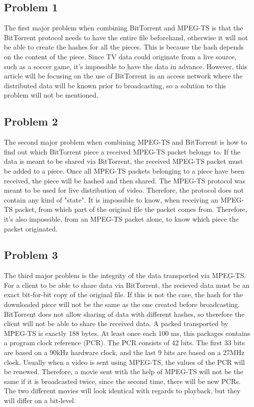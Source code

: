 \documentclass[11pt,oneside,a4paper,onecolumn]{article}
\begin{document}
\subsection{Problem 1}
\label{sec:p1}
The first major problem when combining BitTorrent and MPEG-TS is that
the 
BitTorrent protocol needs to have the entire file beforehand, otherwise
it will not be able to create the hashes for all the pieces. This is
because the hash depends on the content of the piece. Since TV data could originate from a live source, such as a soccer game,
it's impossible to have the data in advance. However, this
article will be focusing on the use of BitTorrent in an access
network where the distributed data will be known prior to broadcasting, so
 a solution to this problem will not be mentioned.

\subsection{Problem 2}
The second major problem when combining MPEG-TS and BitTorrent is how to
find out which BitTorrent piece a received MPEG-TS packet belongs
to. If the data is meant
to be shared via BitTorrent, the received MPEG-TS packet must be added
to a piece. Once all MPEG-TS packets belonging to a piece have been received,
the piece will be hashed and then shared.
The MPEG-TS protocol was meant to be used for live distribution
of video. Therefore, the protocol does not contain any kind of "state".
It is impossible to know, when receiving an MPEG-TS packet, from which
part of the original file the packet comes from. Therefore, it's also
impossible, from an MPEG-TS packet alone, to know which piece the packet
originated.

\subsection{Problem 3}
The third major problem is the integrity of the data transported via
MPEG-TS. For a client to be able to share data via BitTorrent, the
recieved data must be an exact bit-for-bit copy of the original file. If
this is not the case, the hash for the downloaded piece will not be the
same as the one created before broadcasting. BitTorrent does not allow
sharing of data with different hashes, so therefore the client will not be
able to share the received data. A packed transported by MPEG-TS is exactly 188 bytes. At least once
each 100 ms, this packages contains a program clock reference (PCR).
The PCR consists of 42 bits. The first 33 bits are based on a 90kHz
hardware clock, and the last 9 bits are based on a 27MHz clock.
Usually when a video is sent using MPEG-TS, the values of the PCR will
be renewed. Therefore, a movie sent with the help of MPEG-TS will not be
the same if it is broadcasted twice, since the second time, there will
be new PCRs. The two different movies will look identical with regards
to playback, but they will differ on a bit-level. 
\end{document}

